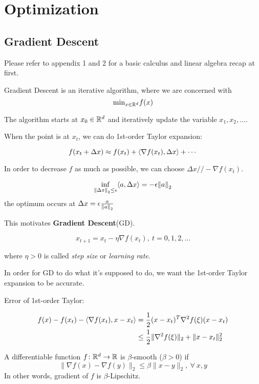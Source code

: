 \part{Optimization}


\chapter{Gradient Descent}
Please refer to appendix 1 and 2 for a basic calculus and linear algebra recap at first. 



Gradient Descent is an iterative algorithm, where we are concerned with 
\[
   \text{min}_{x \in \mathbb{R}^d} f(x)  
\]

The algorithm starts at \(x_0 \in \mathbb{R}^d\) and iteratively update the variable 
\(x_1, x_2, \ldots\). 

When the point is at \(x_t\), we can do 1st-order Taylor expansion: 

\[
    f(x_t + \Delta x) \approx f(x_t) + \langle \nabla f(x_t),  \Delta x \rangle + \cdots 
\]


In order to decrease \(f\) as much as possible, we can choose \(\Delta x // - \nabla f(x_t)\). 

\begin{remark}
    \[
        \inf_{\norm{\Delta x}_2 \leq \epsilon} \langle a, \Delta x \rangle = - \epsilon \norm{a}_2  
    \]
    the optimum occurs at \(\Delta x = \epsilon \frac{a}{\norm{a}_2}\)
\end{remark}


This motivates \textbf{Gradient Descent}(GD). 

\[
    x_{t+1} = x_t - \eta \nabla f(x_t), \ t = 0,1,2,\ldots
\]

where \(\eta > 0\) is called \emph{step size} or \emph{learning rate}. 

In order for GD to do what it's supposed to do, we want the 1st-order Taylor expansion to be 
accurate. 

Error of 1st-order Taylor: 


\begin{align*}
    f(x) - f(x_t) -  \langle \nabla f(x_t), x - x_t \rangle &= \frac{1}{2} (x - x_t)^T \nabla^2 f(\xi) (x - x_t) \\ 
    & \leq \frac{1}{2} \lVert \nabla^2 f(\xi)\rVert_2 + \lVert x - x_t\rVert_2^2
\end{align*}

\begin{definition}[smoothness]
    A differentiable function \(f \colon \mathbb{R}^d \to \mathbb{R}\) is \(\beta\)-smooth (\(\beta > 0\)) if 
    \[
        \lVert \nabla f(x) - \nabla f(y)\rVert_2 \leq \beta\lVert x - y\rVert_2, \ \forall \ x, y   
    \]
    In other words, gradient of \(f\) is \(\beta\)-Lipschitz. 
\end{definition}

